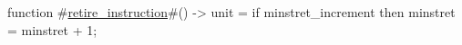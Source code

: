 function #\hyperref[sailRISCVzretirezyinstruction]{retire\_instruction}#() -> unit = {
  if minstret_increment then minstret = minstret + 1;
}
